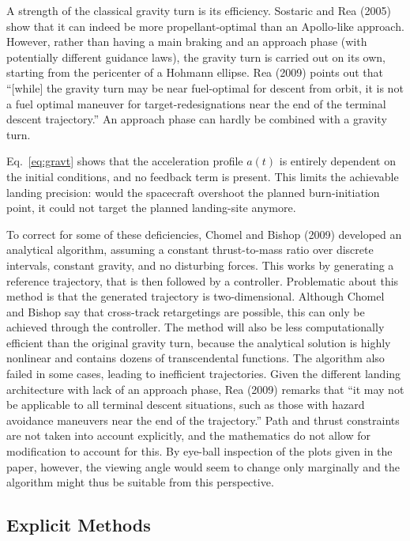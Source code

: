 \documentclass[%
]{aiaa-tc}
\begin{document}
A strength of the classical gravity turn is its efficiency. Sostaric and Rea
(2005) show that it can indeed be more propellant-optimal than an Apollo-like
approach.\cite{Sostaric2005} However, rather than having a main braking and an
approach phase (with potentially different guidance laws), the gravity turn is
carried out on its own, starting from the pericenter of a Hohmann ellipse. Rea
(2009) points out that ``[while] the gravity turn may be near fuel-optimal for
descent from orbit, it is not a fuel optimal maneuver for target-redesignations
near the end of the terminal descent trajectory.''\cite{Rea2009} An approach
phase can hardly be combined with a gravity turn.

Eq.~\ref{eq:gravt} shows that the acceleration profile $a(t)$ is entirely dependent
on the initial conditions, and no feedback term is present. This limits the
achievable landing precision: would the spacecraft overshoot the planned
burn-initiation point, it could not target the planned landing-site anymore.

To correct for some of these deficiencies, Chomel and Bishop (2009) developed an
analytical algorithm, assuming a constant thrust-to-mass ratio over discrete
intervals, constant gravity, and no disturbing forces.\cite{Chomel2009} This
works by generating a reference trajectory, that is then followed by a
controller. Problematic about this method is that the generated trajectory is
two-dimensional. Although Chomel and Bishop say that cross-track retargetings
are possible, this can only be achieved through the controller. The method will
also be less computationally efficient than the original gravity turn, because
the analytical solution is highly nonlinear and contains dozens of
transcendental functions. The algorithm also failed in some cases, leading to
inefficient trajectories. Given the different landing architecture with lack of
an approach phase, Rea (2009) remarks that ``it may not be applicable to all
terminal descent situations, such as those with hazard avoidance maneuvers near
the end of the trajectory.''\cite{Rea2009} Path and thrust constraints are not
taken into account explicitly, and the mathematics do not allow for modification
to account for this. By eye-ball inspection of the plots given in the paper,
however, the viewing angle would seem to change only marginally and the
algorithm might thus be suitable from this perspective.

\subsection{Explicit Methods}
\end{document}
